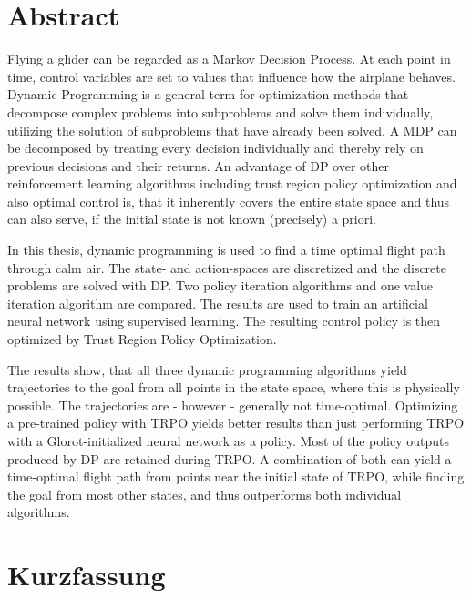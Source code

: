 

\section*{Abstract}

Flying a glider can be regarded as a Markov Decision Process. At each point in time, control variables are set to values that influence how the airplane behaves. Dynamic Programming is a general term for optimization methods that decompose complex problems into subproblems and solve them individually, utilizing the solution of subproblems that have already been solved. A MDP can be decomposed by treating every decision individually and thereby rely on previous decisions and their returns. An advantage of DP over other reinforcement learning algorithms including trust region policy optimization and also optimal control is, that it inherently covers the entire state space and thus can also serve, if the initial state is not known (precisely) a priori.

In this thesis, dynamic programming is used to find a time optimal flight path through calm air. The state- and action-spaces are discretized and the discrete problems are solved with DP. Two policy iteration algorithms and one value iteration algorithm are compared. The results are used to train an artificial neural network using supervised learning. The resulting control policy is then optimized by Trust Region Policy Optimization.

The results show, that all three dynamic programming algorithms yield trajectories to the goal from all points in the state space, where this is physically possible. The trajectories are - however - generally not time-optimal. Optimizing a pre-trained policy with TRPO yields better results than just performing TRPO with a Glorot-initialized neural network as a policy. Most of the policy outputs produced by DP are retained during TRPO. A combination of both can yield a time-optimal flight path from points near the initial state of TRPO, while finding the goal from most other states, and thus outperforms both individual algorithms.
\newpage
\section*{Kurzfassung}

